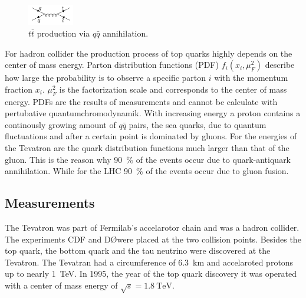 \begin{figure}
    \includegraphics[width=0.18\textwidth]{graphics/tt.png}
    \caption{ $t\bar{t}$ production via $q\bar{q}$ annihilation. \cite{top-quark}}
  \end{figure}
  \FloatBarrier
For hadron collider the production process of top quarks highly depends on the center of mass energy. Parton distribution functions (PDF) $f_i(x_i, \mu_F^2)$ describe how large the probability is to observe a specific parton $i$ with the momentum fraction $x_i$. $\mu_F^2$ is the factorization scale and corresponds to the center of mass energy. PDFs are the results of measurements and cannot be calculate with pertubative quantumchromodynamik. With increasing energy a proton contains a continously growing amount of $q\bar{q}$ pairs, the sea quarks, due to quantum fluctuations and after a certain point is dominated by gluons. For the energies of the Tevatron are the quark distribution functions much larger than that of the gluon. This is the reason why \SI{90}{\percent} of the events occur due to quark-antiquark annihilation. While for the LHC \SI{90}{\percent} of the events occur due to gluon fusion.
\subsection*{Measurements}
The Tevatron was part of Fermilab's accelarotor chain and was a hadron collider. The experiments CDF and D\O were placed at the two collision points. Besides the top quark, the bottom quark and the tau neutrino were discovered at the Tevatron. The Tevatran had a circumference of \SI{6.3}{\kilo\meter} and accelaroted protons up to nearly \SI{1}{\TeV}. In 1995, the year of the top quark discovery it was operated with a center of mass energy of $\sqrt{s}=\SI{1.8}{\TeV}$.
